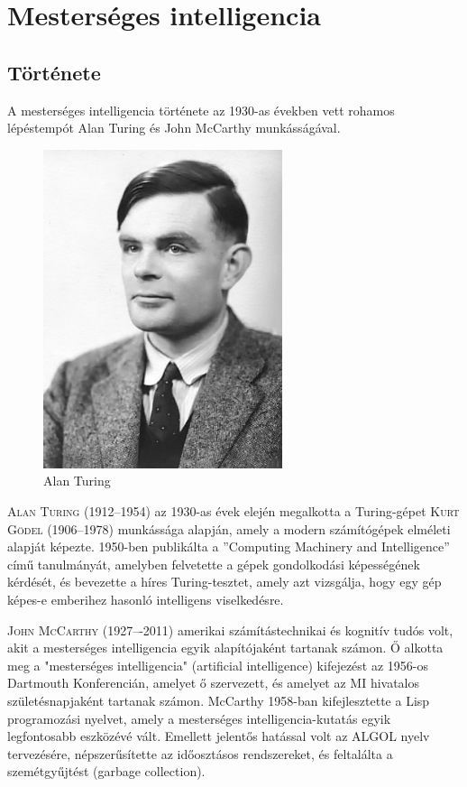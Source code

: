 \documentclass[
]{thesis-ekf}
\theoremstyle{definition}
\theoremstyle{remark}
\begin{document}
\chapter{Mesterséges intelligencia} \label{ai}

\section{Története}

A mesterséges intelligencia története az 1930-as években vett rohamos lépéstempót Alan Turing és John McCarthy munkásságával.

\begin{figure}[h!]
	\centering
	\includegraphics[width=7cm]{./pictures/Alan_Turing.jpg}
	\caption{Alan Turing}
	\label{Turing}
\end{figure} 

\textsc{Alan Turing} (1912--1954) az 1930-as évek elején megalkotta a Turing-gépet \textsc{Kurt Gödel} (1906--1978) munkássága alapján, amely a modern számítógépek elméleti alapját képezte. 1950-ben publikálta a ''Computing Machinery and Intelligence'' című tanulmányát, amelyben felvetette a gépek gondolkodási képességének kérdését, és bevezette a híres Turing-tesztet, amely azt vizsgálja, hogy egy gép képes-e emberihez hasonló intelligens viselkedésre. \cite{AlanTuring,CMI}

\textsc{John McCarthy} (1927–-2011) amerikai számítástechnikai és kognitív tudós volt, akit a mesterséges intelligencia egyik alapítójaként tartanak számon. Ő alkotta meg a "mesterséges intelligencia" (artificial intelligence) kifejezést az 1956-os Dartmouth Konferencián, amelyet ő szervezett, és amelyet az MI hivatalos születésnapjaként tartanak számon. McCarthy 1958-ban kifejlesztette a Lisp programozási nyelvet, amely a mesterséges intelligencia-kutatás egyik legfontosabb eszközévé vált. Emellett jelentős hatással volt az ALGOL nyelv tervezésére, népszerűsítette az időosztásos rendszereket, és feltalálta a szemétgyűjtést (garbage collection). 
\end{document}
